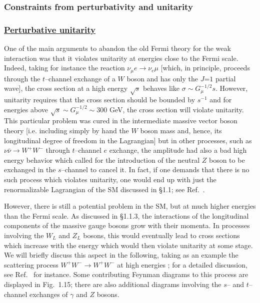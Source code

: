 \subsubsection{Constraints from perturbativity and unitarity}

\subsubsection*{\underline{Perturbative unitarity}}
 
One of the main arguments to abandon the old Fermi theory for the weak
interaction was that it violates unitarity at energies close to the Fermi
scale.  Indeed, taking for  instance the reaction  $\nu_\mu e \to \nu_e \mu$
[which, in principle, proceeds through the $t$--channel exchange of a $W$ 
boson and has only the $J$=$1$ partial wave], the cross section at a high 
energy $\sqrt{s}$ behaves like $\sigma \sim  G_\mu^{-1/2} s$. However, 
unitarity requires that the cross section should be bounded by $s^{-1}$ and for
energies above $\sqrt{s} \sim G_\mu^{-1/2} \sim 300$ GeV, the cross section
will violate unitarity. This particular problem was cured in the intermediate
massive vector boson theory [i.e. including simply by hand the $W$ boson mass
and, hence, its longitudinal degree of freedom in the Lagrangian] but in other
processes, such as $\nu \bar \nu \to W^+ W^-$ through $t$--channel $e$ 
exchange, the amplitude had also a bad high energy behavior which called for the
introduction of the neutral $Z$ boson to be exchanged in the $s$--channel
to cancel it. In fact, if one demands that there is no such process
which  violates unitarity, one would end up with just the renormalizable
Lagrangian of the SM  discussed in \S1.1; see Ref.~\cite{UNITARITY}. \s

However, there is still a potential problem in the SM, but at much higher
energies than the Fermi scale. As discussed in \S1.1.3, the interactions of the
longitudinal components of the massive gauge bosons grow with their momenta. 
In processes involving the $W_L$ and $Z_L$ bosons, this would eventually lead
to cross sections which increase with the energy which would then violate
unitarity at some stage.  We will briefly  discuss this aspect in the
following, taking as an example the scattering process $W^+ W^- \to W^+ W^-$ at
high energies \cite{rho-Veltman,Equivalence-theorem,UNITARITYBounds}; for 
a detailed discussion,
see Ref.~\cite{WWreview} for instance.  Some contributing Feynman diagrams to 
this process are displayed in  Fig.~1.15; there are also additional diagrams 
involving the $s$-- and $t$--channel exchanges of $\gamma$ and $Z$ bosons.\s

